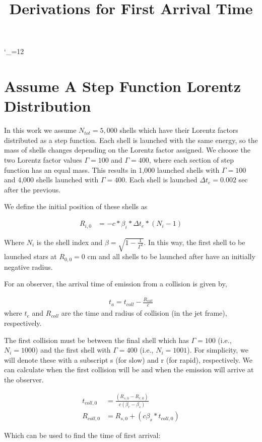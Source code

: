 \documentclass[10pt]{article}
\title{Derivations for First Arrival Time}
\def\upsubscripts{\catcode`\_=12 } \def\normalsubscripts{\catcode`\_=8 }
\begin{document}
\upsubscripts

\section*{Assume A Step Function Lorentz Distribution}

In this work we assume $N_{tot}=5,000$ shells which have their Lorentz factors distributed as a step function. Each shell is launched with the same energy, so the mass of shells changes depending on the Lorentz factor assigned. We choose the two Lorentz factor values $\Gamma=100$ and $\Gamma=400$, where each section of step function has an equal mass. This results in 1,000 launched shells with $\Gamma=100$ and 4,000 shells launched with $\Gamma=400$. Each shell is launched $\Delta t_e = 0.002$ sec after the previous.

We define the initial position of these shells as 

\begin{align}
	R_{i,0} &= -c*\beta_i*\Delta t_e * (N_i-1)
\end{align}

Where $N_i$ is the shell index and $\beta = \sqrt{1-\frac{1}{\Gamma^2}}$. In this way, the first shell to be launched stars at $R_{0,0} = 0$ cm and all shells to be launched after have an initially negative radius.

For an observer, the arrival time of emission from a collision is given by,

\begin{align}
	t_{a} = t_{coll} - \frac{R_{coll}}{c}
\end{align}
where $t_e$ and $R_{coll}$ are the time and radius of collision (in the jet frame), respectively. 

The first collision must be between the final shell which has $\Gamma=100$ (i.e., $N_i=1000$) and the first shell with $\Gamma=400$ (i.e., $N_i=1001$). For simplicity, we will denote these with a subscript s (for slow) and r (for rapid), respectively. We can calculate when the first collision will be and when the emission will arrive at the observer.

\begin{align}
	t_{coll,0} &= \frac{(R_{s,0}-R_{r,0})}{c(\beta_r - \beta_s)} \\ 
	R_{coll,0} &= R_{s,0} + (c\beta_s*t_{coll,0})
\end{align}

Which can be used to find the time of first arrival:
\end{document}
